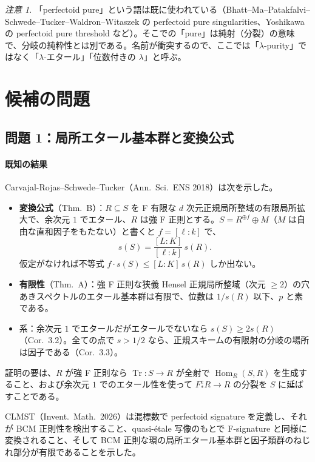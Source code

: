 \documentclass[11pt,a4paper]{ltjsarticle}
\theoremstyle{plain}
\theoremstyle{definition}
\theoremstyle{remark}
\newtheorem*{remark}{注意}
\theoremstyle{plain}
\newcommand{\Hom}{\operatorname{Hom}}
\newcommand{\Tr}{\operatorname{Tr}}
\begin{document}
\begin{remark}
「perfectoid pure」という語は既に使われている（Bhatt--\allowbreak Ma--\allowbreak Patakfalvi--\allowbreak Schwede--\allowbreak Tucker--\allowbreak Waldron--\allowbreak Witaszek の perfectoid pure singularities、Yoshikawa の perfectoid pure threshold など）。そこでの「pure」は純射（分裂）の意味で、分岐の純粋性とは別である。名前が衝突するので、ここでは「$\lambda$-purity」ではなく「$\lambda$-エタール」「位数付きの $\lambda$」と呼ぶ。
\end{remark}

\section{候補の問題}

\subsection{問題 1：局所エタール基本群と変換公式}

\paragraph{既知の結果}
Carvajal-Rojas--Schwede--Tucker（Ann.\ Sci.\ ENS 2018）は次を示した。
\begin{itemize}
  \item \textbf{変換公式}（Thm.~B）：$R\subseteq S$ を F 有限な $d$ 次元正規局所整域の有限局所拡大で、余次元 $1$ でエタール、$R$ は強 F 正則とする。$S = R^{\oplus f}\oplus M$（$M$ は自由な直和因子をもたない）と書くと $f = [\ell:k]$ で、
  \[
    s(S) = \frac{[L:K]}{[\ell:k]}\,s(R).
  \]
  仮定がなければ不等式 $f\cdot s(S)\le[L:K]\,s(R)$ しか出ない。
  \item \textbf{有限性}（Thm.~A）：強 F 正則な狭義 Hensel 正規局所整域（次元 $\ge2$）の穴あきスペクトルのエタール基本群は有限で、位数は $1/s(R)$ 以下、$p$ と素である。
  \item 系：余次元 $1$ でエタールだがエタールでないなら $s(S)\ge 2s(R)$（Cor.~3.2）。全ての点で $s>1/2$ なら、正規スキームの有限射の分岐の場所は因子である（Cor.~3.3）。
\end{itemize}
証明の要は、$R$ が強 F 正則なら $\Tr\colon S\to R$ が全射で $\Hom_R(S,R)$ を生成すること、および余次元 $1$ でのエタール性を使って $F^e_*R\to R$ の分裂を $S$ に延ばすことである。

CLMST（Invent.\ Math.\ 2026）は混標数で perfectoid signature を定義し、それが BCM 正則性を検出すること、quasi-étale 写像のもとで F-signature と同様に変換されること、そして BCM 正則な環の局所エタール基本群と因子類群のねじれ部分が有限であることを示した。
\end{document}
